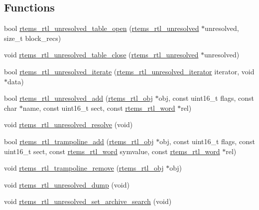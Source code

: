 \subsection*{Functions}
\begin{DoxyCompactItemize}
\item 
bool \mbox{\hyperlink{rtl-unresolved_8c_a0364f188550458858a7f6c5ccdd88bc0}{rtems\+\_\+rtl\+\_\+unresolved\+\_\+table\+\_\+open}} (\mbox{\hyperlink{structrtems__rtl__unresolved}{rtems\+\_\+rtl\+\_\+unresolved}} $\ast$unresolved, size\+\_\+t block\+\_\+recs)
\item 
void \mbox{\hyperlink{rtl-unresolved_8c_afc0bcd9592d51389c269ad21d424bc73}{rtems\+\_\+rtl\+\_\+unresolved\+\_\+table\+\_\+close}} (\mbox{\hyperlink{structrtems__rtl__unresolved}{rtems\+\_\+rtl\+\_\+unresolved}} $\ast$unresolved)
\item 
bool \mbox{\hyperlink{rtl-unresolved_8c_a22858b7a26c780b4206aaa9cf3a08ec6}{rtems\+\_\+rtl\+\_\+unresolved\+\_\+iterate}} (\mbox{\hyperlink{rtl-unresolved_8h_ab256ab6d71a66bca9ea2f63a86026c9d}{rtems\+\_\+rtl\+\_\+unresolved\+\_\+iterator}} iterator, void $\ast$data)
\item 
bool \mbox{\hyperlink{rtl-unresolved_8c_ac44b141fa52eac7924e104379259eddf}{rtems\+\_\+rtl\+\_\+unresolved\+\_\+add}} (\mbox{\hyperlink{structrtems__rtl__obj}{rtems\+\_\+rtl\+\_\+obj}} $\ast$obj, const uint16\+\_\+t flags, const char $\ast$name, const uint16\+\_\+t sect, const \mbox{\hyperlink{rtl-unresolved_8h_a5ab1ca8c94e49686f84f5ccf0731f0e6}{rtems\+\_\+rtl\+\_\+word}} $\ast$rel)
\item 
void \mbox{\hyperlink{rtl-unresolved_8c_a2db5b6d8608d201d44d1ee5db33afd25}{rtems\+\_\+rtl\+\_\+unresolved\+\_\+resolve}} (void)
\item 
bool \mbox{\hyperlink{rtl-unresolved_8c_a996f6ce5f419e92e3d4b00093da4320e}{rtems\+\_\+rtl\+\_\+trampoline\+\_\+add}} (\mbox{\hyperlink{structrtems__rtl__obj}{rtems\+\_\+rtl\+\_\+obj}} $\ast$obj, const uint16\+\_\+t flags, const uint16\+\_\+t sect, const \mbox{\hyperlink{rtl-unresolved_8h_a5ab1ca8c94e49686f84f5ccf0731f0e6}{rtems\+\_\+rtl\+\_\+word}} symvalue, const \mbox{\hyperlink{rtl-unresolved_8h_a5ab1ca8c94e49686f84f5ccf0731f0e6}{rtems\+\_\+rtl\+\_\+word}} $\ast$rel)
\item 
void \mbox{\hyperlink{rtl-unresolved_8c_a962fc939ba38c1794ff7acdb15cdfa16}{rtems\+\_\+rtl\+\_\+trampoline\+\_\+remove}} (\mbox{\hyperlink{structrtems__rtl__obj}{rtems\+\_\+rtl\+\_\+obj}} $\ast$obj)
\item 
void \mbox{\hyperlink{rtl-unresolved_8c_a6777dd435b57c0294d2b34333beee40e}{rtems\+\_\+rtl\+\_\+unresolved\+\_\+dump}} (void)
\item 
void \mbox{\hyperlink{rtl-unresolved_8c_aa2b98ef7a1118212d31908c72730f486}{rtems\+\_\+rtl\+\_\+unresolved\+\_\+set\+\_\+archive\+\_\+search}} (void)
\end{DoxyCompactItemize}


